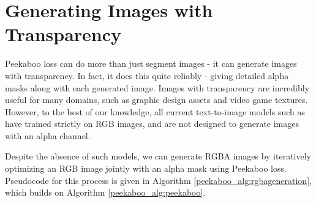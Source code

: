 


\section{Generating Images with Transparency}
\label{peekaboo_sec:rgbagen}

Peekaboo loss can do more than just segment images - it can generate images with transparency. In fact, it does this quite reliably - giving detailed alpha masks along with each generated image.
Images with transparency are incredibly useful for many domains, such as graphic design assets and video game textures. However, to the best of our knowledge, all current text-to-image models such  as \cite{imagen}\cite{StableDiffusion}\cite{parti}\cite{dalle2} have trained strictly on RGB images, and are not designed to generate images with an alpha channel.

Despite the absence of such models, we can generate RGBA images by iteratively optimizing an RGB image jointly with an alpha mask using Peekaboo loss. Pseudocode for this process is given in Algorithm \ref{peekaboo_alg:rgbageneration}, which builds on Algorithm \ref{peekaboo_alg:peekaboo}. 

